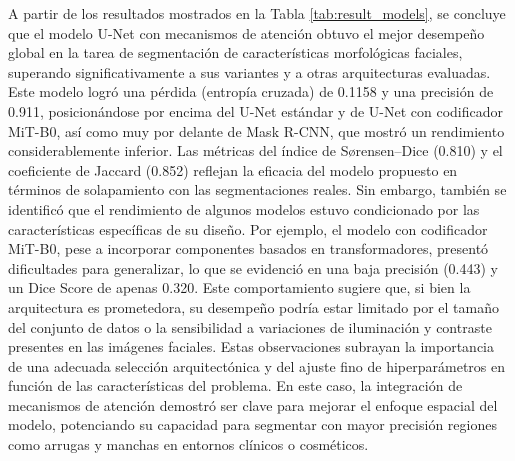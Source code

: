A partir de los resultados mostrados en la Tabla \ref{tab:result_models}, se concluye que el modelo U-Net con mecanismos de atención obtuvo el mejor desempeño global en la tarea de segmentación de características morfológicas faciales, superando significativamente a sus variantes y a otras arquitecturas evaluadas. Este modelo logró una pérdida (entropía cruzada) de 0.1158 y una precisión de 0.911, posicionándose por encima del U-Net estándar y de U-Net con codificador MiT-B0, así como muy por delante de Mask R-CNN, que mostró un rendimiento considerablemente inferior. Las métricas del índice de Sørensen–Dice (0.810) y el coeficiente de Jaccard (0.852) reflejan la eficacia del modelo propuesto en términos de solapamiento con las segmentaciones reales. Sin embargo, también se identificó que el rendimiento de algunos modelos estuvo condicionado por las características específicas de su diseño. Por ejemplo, el modelo con codificador MiT-B0, pese a incorporar componentes basados en transformadores, presentó dificultades para generalizar, lo que se evidenció en una baja precisión (0.443) y un Dice Score de apenas 0.320. Este comportamiento sugiere que, si bien la arquitectura es prometedora, su desempeño podría estar limitado por el tamaño del conjunto de datos o la sensibilidad a variaciones de iluminación y contraste presentes en las imágenes faciales. Estas observaciones subrayan la importancia de una adecuada selección arquitectónica y del ajuste fino de hiperparámetros en función de las características del problema. En este caso, la integración de mecanismos de atención demostró ser clave para mejorar el enfoque espacial del modelo, potenciando su capacidad para segmentar con mayor precisión regiones como arrugas y manchas en entornos clínicos o cosméticos.

